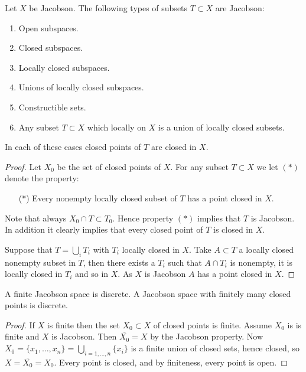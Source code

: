 \begin{lemma}
\label{lemma-jacobson-inherited}
Let $X$ be Jacobson. The following types of subsets $T \subset X$
are Jacobson:
\begin{enumerate}
\item Open subspaces.
\item Closed subspaces.
\item Locally closed subspaces.
\item Unions of locally closed subspaces.
\item Constructible sets.
\item Any subset $T \subset X$ which locally on $X$
is a union of locally closed subsets.
\end{enumerate}
In each of these cases closed points of $T$ are
closed in $X$.
\end{lemma}

\begin{proof}
Let $X_0$ be the set of closed points of $X$. For any subset
$T \subset X$ we let $(*)$ denote the property:
\begin{itemize}
\item[(*)] Every nonempty locally closed subset of $T$ has a point
closed in $X$.
\end{itemize}
Note that always $X_0 \cap T \subset T_0$. Hence property $(*)$
implies that $T$ is Jacobson. In addition it clearly implies
that every closed point of $T$ is closed in $X$.

\medskip\noindent
Suppose that $T=\bigcup_i T_i$ with $T_i$ locally closed in $X$.
Take $A\subset T$ a locally closed nonempty subset in $T$,
then there exists a $T_i$ such that $A\cap T_i$ is nonempty, it is
locally closed in $T_i$ and so in $X$.
As $X$ is Jacobson $A$ has a point closed in $X$.
\end{proof}

\begin{lemma}
\label{lemma-finite-jacobson}
A finite Jacobson space is discrete.
A Jacobson space with finitely many closed points is discrete.
\end{lemma}

\begin{proof}
If $X$ is finite then the set $X_0 \subset X$ of closed points is finite.
Assume $X_0$ is is finite and $X$ is Jacobson.
Then $\overline{X_0} = X$ by the Jacobson property.
Now $X_0 =\{x_1, \ldots, x_n\} = \bigcup_{i = 1, \ldots, n} \{x_i\}$
is a finite union of closed sets, hence closed, so
$X = \overline{X_0} = X_0$. Every point is closed, and by
finiteness, every point is open.
\end{proof}

